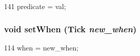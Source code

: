 \begin{DoxyCode}
141 { predicate = val; }
\end{DoxyCode}
\hypertarget{classTrace_1_1InstRecord_aff946f7463b38f324046493d6e5d3e37}{
\subsubsection[{setWhen}]{\setlength{\rightskip}{0pt plus 5cm}void setWhen ({\bf Tick} {\em new\_\-when})}}
\label{classTrace_1_1InstRecord_aff946f7463b38f324046493d6e5d3e37}



\begin{DoxyCode}
114 { when = new_when; }
\end{DoxyCode}


